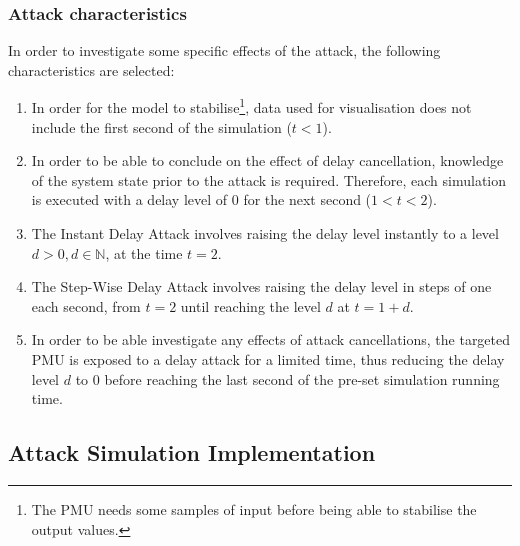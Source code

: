 \subsubsection{Attack characteristics}
In order to investigate some specific effects of the attack, the following characteristics are selected:
\begin{enumerate}
\item In order for the model to stabilise\footnote{The PMU needs some samples of input before being able to stabilise the output values.}, data used for visualisation does not include the first second of the simulation ($t < 1$).
\item In order to be able to conclude on the effect of delay cancellation, knowledge of the system state prior to the attack is required. Therefore, each simulation is executed  with a delay level of 0 for the next second ($1 < t < 2$). 
\item  The Instant Delay Attack involves raising the delay level instantly to a level $d > 0,  d \in \mathbb{N}$, at the time $t = 2$.
\item  The Step-Wise Delay Attack involves raising the delay level in steps of one each second, from $t = 2$ until reaching the level $d$ at $t = 1+d$.  
\item  In order to be able investigate any effects of attack cancellations, the targeted PMU is exposed to a delay attack for a limited time, thus reducing the delay level $d$ to $0$ before reaching the last second of the pre-set simulation running time.   
\end{enumerate}
    
\subsection{Attack Simulation Implementation}





